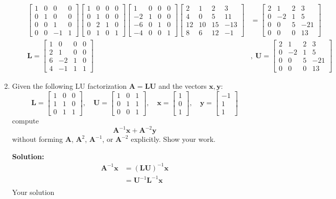 \documentclass[]{article}
\newcommand{\A}{\bm{A}}					%
\newcommand{\ML}{\bm{L}}				%
\newcommand{\MU}{\bm{U}}				%
\newcommand{\bbm}{\begin{bmatrix}}		%
\newcommand{\ebm}{\end{bmatrix}}		%
\newcommand{\x}{\bm{x}}					%
\newcommand{\y}{\bm{y}}					%
\newcommand{\solution}{\vskip 0.5cm \textbf{\large Solution:} \\}
\begin{document}
\begin{enumerate}
\begin{enumerate}
\[\begin{split}
        \bbm 1&0&0&0 \\ 0&1&0&0 \\ 0&0&1&0 \\ 0&0&-1&1 \ebm \bbm 1&0&0&0 \\ 0&1&0&0 \\ 0&2&1&0 \\ 0&1&0&1 \ebm \bbm 1&0&0&0 \\ -2&1&0&0 \\ -6&0&1&0 \\ -4&0&0&1 \ebm \bbm 2&1&2&3\\4&0&5&11\\12&10&15&-13\\8&6&12&-1 \ebm &= \bbm 2&1&2&3\\0&-2&1&5\\0&0&5&-21\\0&0&0&13 \ebm \\
        \ML = \bbm 1&0&0&0 \\ 2&1&0&0 \\ 6&-2&1&0 \\ 4&-1&1&1 \ebm &,~\MU = \bbm 2&1&2&3\\0&-2&1&5\\0&0&5&-21\\0&0&0&13 \ebm
        \end{split}\]
	  \end{enumerate}

	\item Given the following LU factorization $\A=\bm{LU}$ and the vectors $\x,\y$:
	  \[
	  \bm{L}=\bbm 1&0&0\\1&1&0\\0&1&1\ebm,\quad \bm{U}=\bbm 1&0&1\\0&1&1\\0&0&1\ebm,\quad \x=\bbm 1\\0\\1\ebm, \quad \y=\bbm -1\\1\\1\ebm
	  \]
	  compute
	  \[
	  \A^{-1}\x + \A^{-2}\y
	  \]
	  without forming $\A$, $\A^2$, $\A^{-1}$, or $\A^{-2}$ explicitly. Show your work.

	  \solution
      \[\begin{split}
      \A^{-1}\x &= (\bm{LU})^{-1}\x \\
      &= \bm{U}^{-1}\bm{L}^{-1}\x \\
      
      \end{split}\]
	  Your solution

    \end{enumerate}
\end{document}
